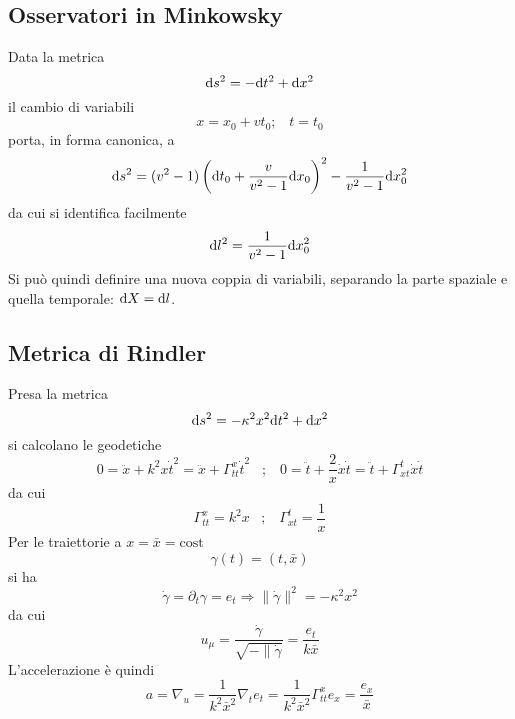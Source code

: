 \subsection{Osservatori in Minkowsky}
Data la metrica 
\[ \mathrm{d} s^2 = -\mathrm{d} t^2 + \mathrm{d} x^2 \]
il cambio di variabili
\[ x = x_0 + vt_0 ; \;\;\; t = t_0 \]
porta, in forma canonica, a 
\[ \mathrm{d} s ^2 = (v^2 -1)\left( \mathrm{d} t_0 + \frac{v}{v^2 -1} \mathrm{d} x_0\right)^2   - \frac{1}{v^2-1} \mathrm{d} x_0^2 \]
da cui si identifica facilmente
\[ \mathrm{d} l^2 = \frac{1}{v^2-1} \mathrm{d} x_0^2 \]
Si pu\`o quindi definire una nuova coppia di variabili, separando la parte spaziale e quella temporale: \( \mathrm{d} X = \mathrm{d} l \).



\subsection{Metrica di Rindler}
Presa la metrica 
\[ \mathrm{d} s^2 = -\kappa^2x^2\mathrm{d} t^2 +\mathrm{d} x^2 \]
si calcolano le geodetiche
\[ 0 = \ddot{x} + k^2x\dot{t}^2 = \ddot{x} + \Gamma^x_{tt} \dot{t}^2 \;\;\; ;\;\;\; 0= \ddot{t} + \frac{2}{x} \dot{x}\dot{t} = \ddot{t} + \Gamma^t_{xt}\dot{x}\dot{t} \]
da cui 
\[ \Gamma^x_{tt} = k^2x \;\;\;;\;\;\;  \Gamma^t_{xt} = \frac{1}{x} \]
Per le traiettorie a \(x=\bar{x}=\mathrm{cost} \)
\[ \gamma(t) = (t,\bar{x}) \]
si ha 
\[ \dot{\gamma} = \partial_t \gamma= e_t \Rightarrow \|\dot{\gamma}\|^2 =-\kappa^2x^2  \]
da cui 
\[ u_\mu = \frac{\dot{\gamma}}{\sqrt{-\|\dot{\gamma}}} = \frac{e_t}{k\bar{x}} \]
L'accelerazione \`e quindi
\[ a = \nabla_ u = \frac{1}{k^2\bar{x}^2} \nabla_t e_t =  \frac{1}{k^2\bar{x}^2} \Gamma_{tt}^x e_x = \frac{e_x}{\bar{x}} \]






